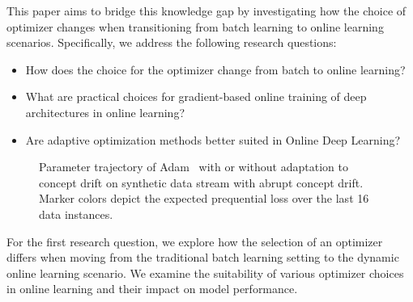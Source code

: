 \documentclass[letterpaper]{article} %
\begin{document}
This paper aims to bridge this knowledge gap by investigating how the choice of optimizer changes when transitioning from batch learning to online learning scenarios. Specifically, we address the following research questions:
\begin{itemize}
	\item How does the choice for the optimizer change from batch to online learning?
	\item What are practical choices for gradient-based online training of deep architectures in online learning?
	\item Are adaptive optimization methods better suited in Online Deep Learning?
\end{itemize}
\begin{figure}[ht]
	\centering
	\caption{Parameter trajectory of Adam~\cite{kingmaAdamMethodStochastic2017b} with or without adaptation to concept drift on synthetic data stream with abrupt concept drift. Marker colors depict the expected prequential loss over the last 16 data instances.}
\end{figure}
For the first research question, we explore how the selection of an optimizer differs when moving from the traditional batch learning setting to the dynamic online learning scenario. We examine the suitability of various optimizer choices in online learning and their impact on model performance.
\end{document}
